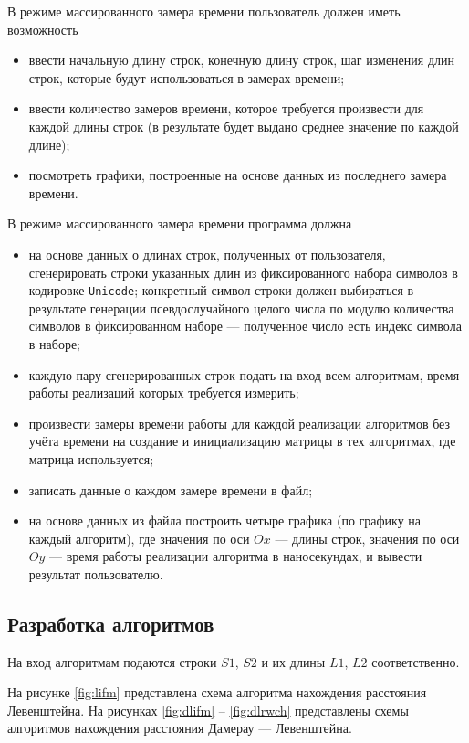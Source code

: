 В режиме массированного замера времени пользователь должен иметь возможность
\begin{itemize}
    \item ввести начальную длину строк, конечную длину строк, шаг изменения длин строк, которые будут использоваться в замерах времени;
    \item ввести количество замеров времени, которое требуется произвести для каждой длины строк (в результате будет выдано среднее значение по каждой длине);
    \item посмотреть графики, построенные на основе данных из последнего замера времени.
\end{itemize}

В режиме массированного замера времени программа должна
\begin{itemize}
    \item на основе данных о длинах строк, полученных от пользователя, сгенерировать строки указанных длин из фиксированного набора символов в кодировке \texttt{Unicode}; конкретный символ строки должен выбираться в результате генерации псевдослучайного целого числа по модулю количества символов в фиксированном наборе --- полученное число есть индекс символа в наборе;
    \item каждую пару сгенерированных строк подать на вход всем алгоритмам, время работы реализаций которых требуется измерить;
    \item произвести замеры времени работы для каждой реализации алгоритмов без учёта времени на создание и инициализацию матрицы в тех алгоритмах, где матрица используется;
    \item записать данные о каждом замере времени в файл;
    \item на основе данных из файла построить четыре графика (по графику на каждый алгоритм), где значения по оси $Ox$ --- длины строк, значения по оси $Oy$ --- время работы реализации алгоритма в наносекундах, и вывести результат пользователю.
\end{itemize}

\newpage

\subsection{Разработка алгоритмов}

На вход алгоритмам подаются строки $S1$, $S2$ и их длины $L1$, $L2$ соответственно.

На рисунке \ref{fig:lifm} представлена схема алгоритма нахождения расстояния Левенштейна.
На рисунках \ref{fig:dlifm} -- \ref{fig:dlrwch} представлены схемы алгоритмов нахождения расстояния Дамерау --- Левенштейна.

